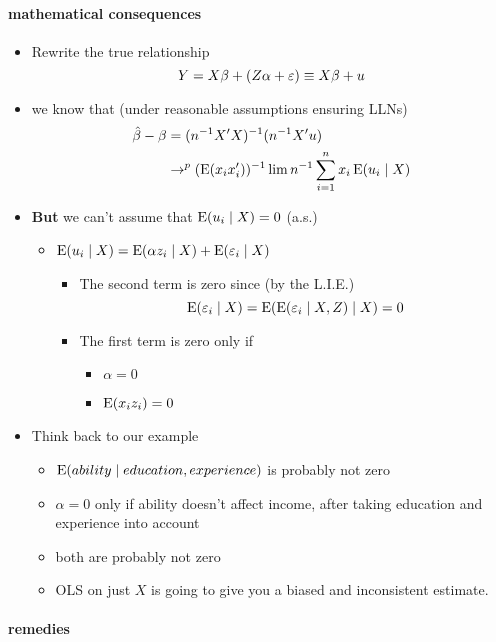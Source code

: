 \paragraph{mathematical consequences}
\begin{itemize}
\item Rewrite the true relationship
  \[ Y = X\beta + (Z\alpha + \varepsilon) \equiv X\beta + u \]
\item we know that (under reasonable assumptions ensuring LLNs)
  \begin{align*}
    \hat{\beta} - \beta
    &= (n^{-1} X'X)^{-1}(n^{-1} X'u) \\
    &\to^p (\operatorname{E}(x_{i}x_{i}'))^{-1} \lim n^{-1} \sum_{i=1}^{n} x_{i} \operatorname{E}(u_{i} \mid X)
  \end{align*}
\item \textbf{But} we can't assume that $\operatorname{E}(u_i \mid X) = 0$ (a.s.)
\begin{itemize}
\item $\operatorname{E}(u_{i} \mid X) = \operatorname{E}(\alpha z_{i} \mid X) + \operatorname{E}(\varepsilon_{i} \mid X)$
\begin{itemize}
\item The second term is zero since (by the L.I.E.)
  \[\operatorname{E}(\varepsilon_{i} \mid X) = \operatorname{E}(\operatorname{E}(\varepsilon_{i}\mid X, Z) \mid X) = 0\]
\item The first term is zero only if
\begin{itemize}
\item $\alpha = 0$
\item $\operatorname{E}(x_{i} z_{i}) = 0$
\end{itemize}
\end{itemize}
\end{itemize}
\item Think back to our example
\begin{itemize}
\item $\operatorname{E}(ability \mid education, experience)$ is probably not zero
\item $\alpha = 0$ only if ability doesn't affect income, after
           taking education and experience into account
\item both are probably not zero
\item OLS on just $X$ is going to give you a biased and
           inconsistent estimate.
\end{itemize}
\end{itemize}

\paragraph{remedies}


